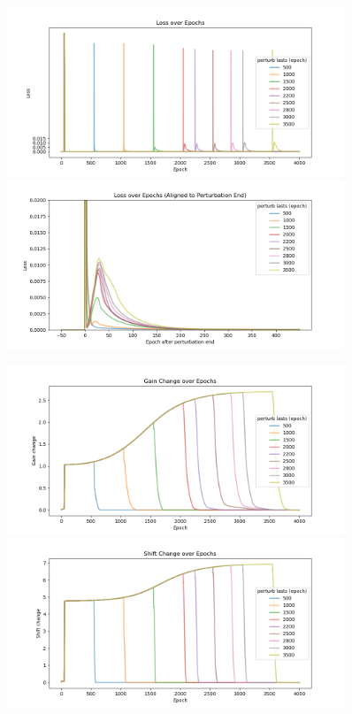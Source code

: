 \documentclass[12pt, a4paper]{article}
\begin{document}
\begin{figure}[H]
    \centering
    \includegraphics[width=0.9\textwidth]{FNN/fig/temp_abb05_perturb_loss_train_insigmoid.png} \\
    \includegraphics[width=0.9\textwidth]{FNN/fig/temp_abb05_perturb_loss_align_insigmoid.png} \\
\end{figure}

\begin{figure}[H]
    \centering
    \includegraphics[width=0.9\textwidth]{FNN/fig/temp_abb05_perturb_gc_insigmoid.png} \\
    \includegraphics[width=0.9\textwidth]{FNN/fig/temp_abb05_perturb_sc_insigmoid.png} \\
\end{figure}
\end{document}
